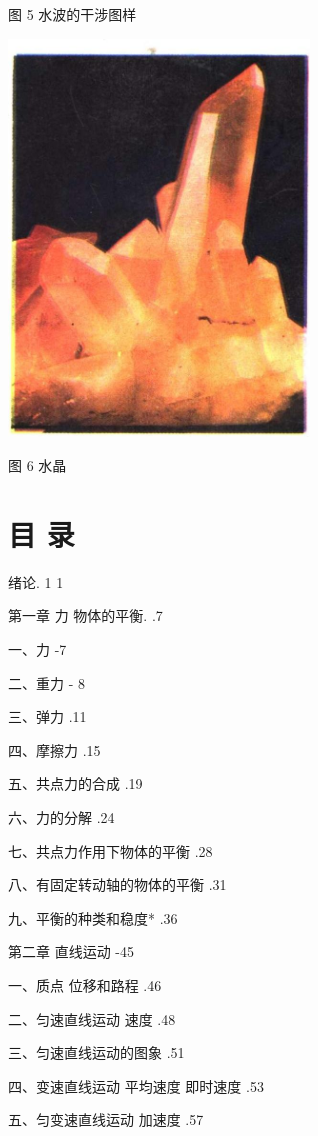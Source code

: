 \documentclass[10pt]{article}
\begin{document}
图 5 水波的干涉图样

\begin{center}
\includegraphics[max width=0.6\textwidth]{images/01912d55-147c-70aa-b0e0-1782a122f948_4_217917.jpg}
\end{center}

图 6 水晶

\section*{目 录}

绪论. 1 1

第一章 力 物体的平衡. .7

一、力 -7

二、重力 - 8

三、弹力 .11

四、摩擦力 .15

五、共点力的合成 .19

六、力的分解 .24

七、共点力作用下物体的平衡 .28

八、有固定转动轴的物体的平衡 .31

九、平衡的种类和稳度* .36

第二章 直线运动 -45

一、质点 位移和路程 .46

二、匀速直线运动 速度 .48

三、匀速直线运动的图象 .51

四、变速直线运动 平均速度 即时速度 .53

五、匀变速直线运动 加速度 .57
\end{document}
